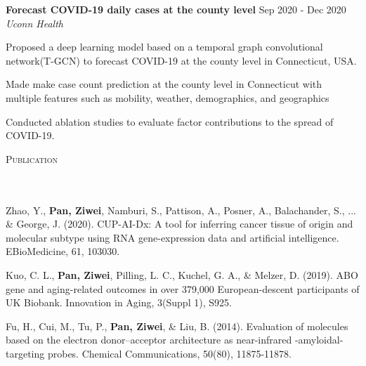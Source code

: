 \documentclass{article}
\newcommand{\header}[1]{{
\hspace*{-15pt}\vspace*{6pt} \textsc{#1}} \vspace*{-6pt} 
\lineunder
}
\newcommand{\lineunder}{
\vspace*{-8pt} \\ \hspace*{-18pt} 
\hrulefill \\
}
\newcommand{\content}{
\vspace*{2pt}%
}
\newcommand{\project}[4]{{
\vspace*{2pt}%
\textbf{#1} #2 \hfill #3\\ \textit{#4} \vspace*{2pt}}
}
\renewcommand{\labelitemii}{
$\vcenter{\hbox{\tiny$\bullet$}}$\hspace*{-3pt}
}
\newenvironment{bullet-list-minor}{
\begin{list}{\labelitemii}{\setlength\leftmargin{15pt} 
\topsep 0pt \itemsep -2pt}}{\vspace*{4pt}\end{list}
}
\begin{document}
    \project{Forecast COVID-19 daily cases at the county level}{}{Sep 2020 - Dec 2020}{Uconn Health}
	\begin{bullet-list-minor}
	\item Proposed a deep learning model based on a temporal graph convolutional network(T-GCN) to forecast COVID-19 at the county level in Connecticut, USA. 
	\item Made make case count prediction at the county level in Connecticut with multiple features such as mobility, weather, demographics, and geographics
	\item Conducted ablation studies to evaluate factor contributions to the spread of COVID-19.
    \end{bullet-list-minor}


\vspace*{4pt}%
\header{Publication}
    \content{Zhao, Y., \textbf{Pan, Ziwei}, Namburi, S., Pattison, A., Posner, A., Balachander, S., ... \& George, J. (2020). CUP-AI-Dx: A tool for inferring cancer tissue of origin and molecular subtype using RNA gene-expression data and artificial intelligence. EBioMedicine, 61, 103030.\\}
    \content{Kuo, C. L., \textbf{Pan, Ziwei}, Pilling, L. C., Kuchel, G. A., \& Melzer, D. (2019). ABO gene and aging-related outcomes in over 379,000 European-descent participants of UK Biobank. Innovation in Aging, 3(Suppl 1), S925.\\}
    \content{Fu, H., Cui, M., Tu, P., \textbf{Pan, Ziwei}, \& Liu, B. (2014). Evaluation of molecules based on the electron donor–acceptor architecture as near-infrared  \textbeta-amyloidal-targeting probes. Chemical Communications, 50(80), 11875-11878.}
\end{document}
